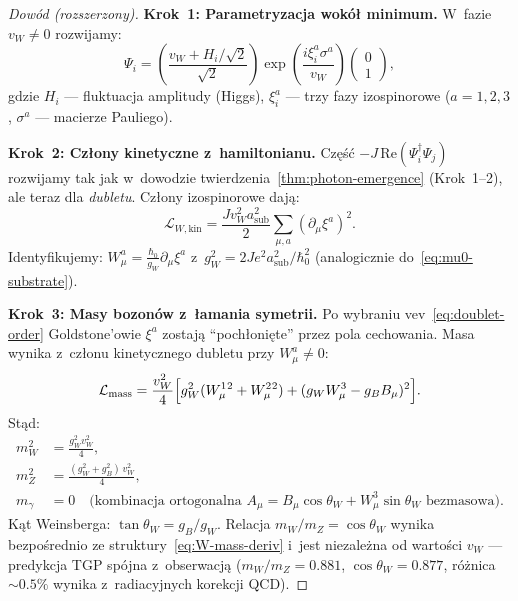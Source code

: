 \begin{proof}[Dowód (rozszerzony)]
\textbf{Krok~1: Parametryzacja wokół minimum.}
W~fazie $v_W \neq 0$ rozwijamy:
\begin{equation}\label{eq:su2-fluct}
    \Psi_i = \left(\frac{v_W + H_i/\sqrt{2}}{\sqrt{2}}\right)
    \exp\!\left(\frac{i\xi_i^a\sigma^a}{v_W}\right)
    \begin{pmatrix}0\\1\end{pmatrix},
\end{equation}
gdzie $H_i$ --- fluktuacja amplitudy (Higgs), $\xi_i^a$ ---
trzy fazy izospinorowe ($a=1,2,3$, $\sigma^a$ --- macierze Pauliego).

\textbf{Krok~2: Człony kinetyczne z~hamiltonianu.}
Część $-J\,\mathrm{Re}(\Psi_i^\dagger\Psi_j)$ rozwijamy tak jak
w~dowodzie twierdzenia~\ref{thm:photon-emergence} (Krok~1--2), ale
teraz dla \emph{dubletu}. Człony izospinorowe dają:
\begin{equation}\label{eq:su2-kinetic}
    \mathcal{L}_{W,\mathrm{kin}}
    = \frac{Jv_W^2 a_{\mathrm{sub}}^2}{2}
    \sum_{\mu,a}(\partial_\mu\xi^a)^2.
\end{equation}
Identyfikujemy: $W_\mu^a = \frac{\hbar_0}{g_W}\partial_\mu\xi^a$
z~$g_W^2 = 2Je^2 a_{\mathrm{sub}}^2/\hbar_0^2$ (analogicznie do~\eqref{eq:mu0-substrate}).

\textbf{Krok~3: Masy bozonów z~łamania symetrii.}
Po wybraniu vev~\eqref{eq:doublet-order} Goldstone'owie
$\xi^a$ zostają ``pochłonięte'' przez pola cechowania.
Masa wynika z~członu kinetycznego dubletu przy $W_\mu^a \neq 0$:
\begin{equation}\label{eq:W-mass-deriv}
    \mathcal{L}_{\mathrm{mass}}
    = \frac{v_W^2}{4}
      \Bigl[g_W^2(W_\mu^1{}^2 + W_\mu^2{}^2)
      + (g_W W_\mu^3 - g_B B_\mu)^2\Bigr].
\end{equation}
Stąd:
\begin{align}
    m_W^2 &= \frac{g_W^2 v_W^2}{4}, \label{eq:mW-derived}\\
    m_Z^2 &= \frac{(g_W^2 + g_B^2)\,v_W^2}{4}, \label{eq:mZ-derived}\\
    m_\gamma &= 0
    \quad\text{(kombinacja ortogonalna
    $A_\mu = B_\mu\cos\theta_W + W_\mu^3\sin\theta_W$ bezmasowa)}. \label{eq:mgamma-zero}
\end{align}
Kąt Weinsberga: $\tan\theta_W = g_B/g_W$. Relacja
$m_W/m_Z = \cos\theta_W$ wynika bezpośrednio ze struktury~\eqref{eq:W-mass-deriv}
i~jest niezależna od wartości $v_W$ --- predykcja TGP
spójna z~obserwacją ($m_W/m_Z = 0.881$, $\cos\theta_W = 0.877$,
różnica $\sim 0.5\%$ wynika z~radiacyjnych korekcji QCD).
\end{proof}

